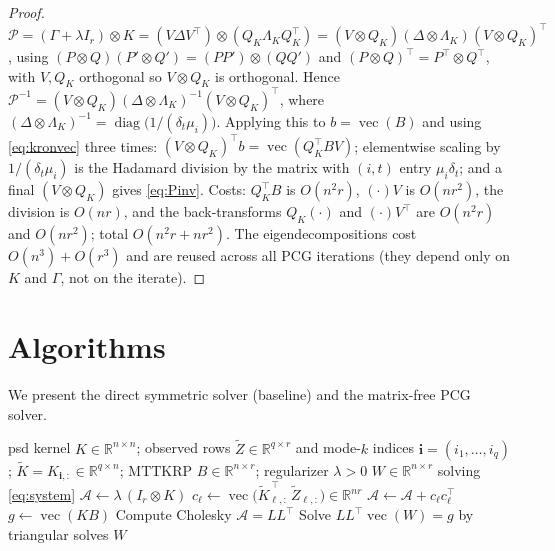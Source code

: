 \documentclass[12pt]{article}
\DeclareMathOperator{\vecop}{vec}
\DeclareMathOperator{\diag}{diag}
\newcommand{\bR}{\mathbb{R}}
\begin{document}
\begin{proof}
$\mathcal P=(\Gamma+\lambda I_r)\otimes K=(V\Delta V^{\!\top})\otimes
(Q_K\Lambda_K Q_K^{\!\top})=(V\otimes Q_K)(\Delta\otimes\Lambda_K)(V\otimes
Q_K)^{\!\top}$, using $(P\otimes Q)(P'\otimes Q')=(PP')\otimes(QQ')$ and
$(P\otimes Q)^{\!\top}=P^{\!\top}\otimes Q^{\!\top}$, with $V,Q_K$ orthogonal so
$V\otimes Q_K$ is orthogonal. Hence
$\mathcal P^{-1}=(V\otimes Q_K)(\Delta\otimes\Lambda_K)^{-1}(V\otimes Q_K)^{\!\top}$,
where $(\Delta\otimes\Lambda_K)^{-1}=\diag\big(1/(\delta_t\mu_i)\big)$. Applying
this to $b=\vecop(B)$ and using \eqref{eq:kronvec} three times:
$(V\otimes Q_K)^{\!\top}b=\vecop(Q_K^{\!\top}BV)$; elementwise scaling by
$1/(\delta_t\mu_i)$ is the Hadamard division by the matrix with $(i,t)$ entry
$\mu_i\delta_t$; and a final $(V\otimes Q_K)$ gives \eqref{eq:Pinv}. Costs:
$Q_K^{\!\top}B$ is $O(n^2r)$, $(\cdot)V$ is $O(nr^2)$, the division is $O(nr)$,
and the back-transforms $Q_K(\cdot)$ and $(\cdot)V^{\!\top}$ are $O(n^2r)$ and
$O(nr^2)$; total $O(n^2r+nr^2)$. The eigendecompositions cost $O(n^3)+O(r^3)$
and are reused across all PCG iterations (they depend only on $K$ and $\Gamma$,
not on the iterate).
\end{proof}

\section{Algorithms}

We present the direct symmetric solver (baseline) and the matrix-free PCG solver.

\begin{algorithm}[h]
\caption{Direct symmetric solver for the mode-$k$ RKHS subproblem}
\label{alg:direct}
\begin{algorithmic}[1]
  \Require psd kernel $K\in\bR^{n\times n}$; observed rows $\widetilde Z\in\bR^{q\times r}$
    and mode-$k$ indices $\mathbf i=(i_1,\dots,i_q)$; $\widetilde K=K_{\mathbf i,:}\in\bR^{q\times n}$;
    MTTKRP $B\in\bR^{n\times r}$; regularizer $\lambda>0$
  \Ensure $W\in\bR^{n\times r}$ solving \eqref{eq:system}
  \State $\mathcal A\gets \lambda\,(I_r\otimes K)$  
     \State $c_\ell\gets \vecop\!\big(\widetilde K_{\ell,:}^{\,\top}\,\widetilde Z_{\ell,:}\big)\in\bR^{nr}$ 
     \State $\mathcal A\gets \mathcal A + c_\ell c_\ell^{\!\top}$ 
  \EndFor
  \State $g\gets \vecop(KB)$ \Comment{RHS $(I_r\otimes K)\vecop(B)$, $O(n^2r)$}
  \State Compute Cholesky $\mathcal A=LL^{\!\top}$ 
  \State Solve $LL^{\!\top}\vecop(W)=g$ by triangular solves 
  \State \Return $W$
\end{algorithmic}
\end{algorithm}
\end{document}

